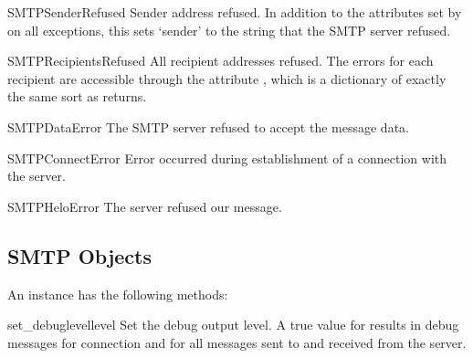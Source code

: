 \begin{excdesc}{SMTPSenderRefused}
  Sender address refused.  In addition to the attributes set by on all
   exceptions, this sets `sender' to
  the string that the SMTP server refused.
\end{excdesc}

\begin{excdesc}{SMTPRecipientsRefused}
  All recipient addresses refused.  The errors for each recipient are
  accessible through the attribute , which is a
  dictionary of exactly the same sort as 
  returns.
\end{excdesc}

\begin{excdesc}{SMTPDataError}
  The SMTP server refused to accept the message data.
\end{excdesc}

\begin{excdesc}{SMTPConnectError}
  Error occurred during establishment of a connection  with the server.
\end{excdesc}

\begin{excdesc}{SMTPHeloError}
  The server refused our  message.
\end{excdesc}


\begin{seealso}
\end{seealso}


\subsection{SMTP Objects \label{SMTP-objects}}

An  instance has the following methods:

\begin{methoddesc}{set_debuglevel}{level}
Set the debug output level.  A true value for  results in
debug messages for connection and for all messages sent to and
received from the server.
\end{methoddesc}

